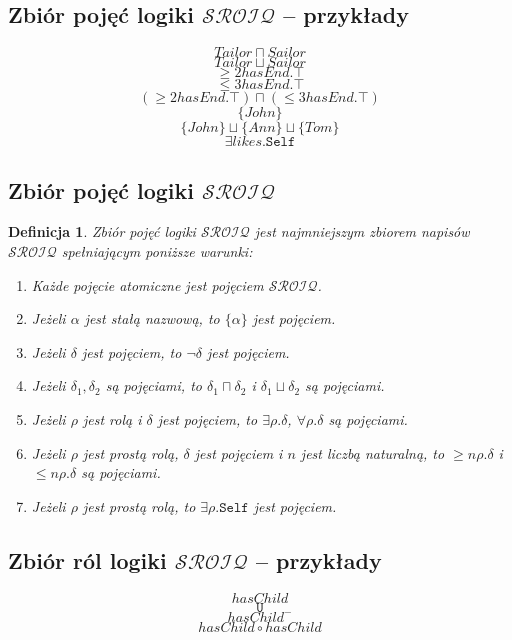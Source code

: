 \documentclass[12pt]{article}
\newtheorem{definicja}{Definicja}
\begin{document}
\subsection{Zbiór pojęć logiki $\mathcal{SROIQ}$ -- przykłady}
%
$$Tailor \sqcap Sailor$$
$$Tailor \sqcup Sailor$$
%
$$\geq 2 hasEnd . \top$$
$$\leq 3 hasEnd . \top$$
%
$$(\geq 2 hasEnd . \top) \sqcap (\leq 3 hasEnd . \top)$$
%
$$\{ John \}$$
%
$$\{ John \} \sqcup \{ Ann \} \sqcup \{ Tom \}$$
%
$$\exists likes .\texttt{Self}$$
%


\subsection{Zbiór pojęć logiki $\mathcal{SROIQ}$}
%
\begin{definicja}
\label{CONCEPTSROIQ}
Zbiór pojęć logiki $\mathcal{SROIQ}$ jest najmniejszym zbiorem napisów $\mathcal{SROIQ}$ spełniającym poniższe warunki:
%
\begin{enumerate}
\item Każde pojęcie atomiczne jest pojęciem $\mathcal{SROIQ}$.
%
\item Jeżeli $\alpha$ jest stałą nazwową, to $\{ \alpha \}$ jest pojęciem.
%
\item Jeżeli $\delta$ jest pojęciem, to $\neg \delta$ jest pojęciem.
%
\item Jeżeli $\delta_{1}, \delta_{2}$ są pojęciami, to $\delta_{1} \sqcap \delta_{2}$ i $\delta_{1} \sqcup \delta_{2}$ są pojęciami.
%
\item Jeżeli $\rho$ jest rolą i $\delta$ jest pojęciem, to $\exists \rho . \delta$, $\forall \rho . \delta$ są pojęciami.
%
\item Jeżeli $\rho$ jest prostą rolą, $\delta$ jest pojęciem i $n$ jest liczbą naturalną, to $\geq n \rho . \delta$ i $\leq n \rho . \delta$ są pojęciami.
%
\item Jeżeli $\rho$ jest prostą rolą, to $\exists \rho. \texttt{Self}$ jest pojęciem.
\end{enumerate}
\end{definicja}
%

\subsection{Zbiór ról logiki $\mathcal{SROIQ}$ -- przykłady}
%
$$hasChild$$
%
$$\texttt{U}$$
%
$$hasChild^{-}$$
%
$$hasChild \circ hasChild$$
%
\end{document}

